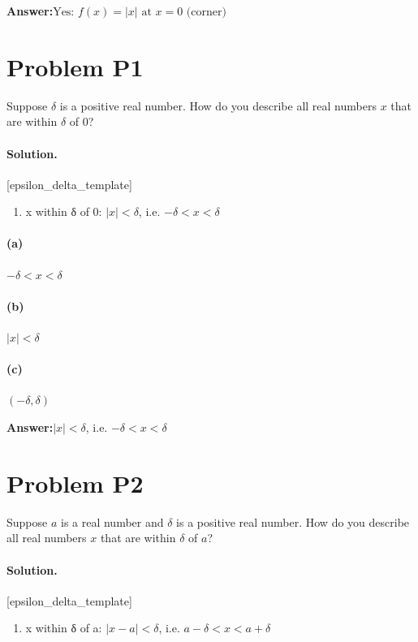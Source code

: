 \documentclass[11pt,a4paper]{article}
\newcommand{\solvertag}[1]{{\footnotesize\color{gray}\textsf{[#1]}}}
\begin{document}
\noindent\textbf{Answer:}\quad $\text{Yes: } f(x) = |x| \text{ at } x = 0 \text{ (corner)}$

\medskip

\section*{Problem P1}
Suppose $\delta$ is a positive real number. How do you describe all real numbers $x$ that are within $\delta$ of 0?

\paragraph{Solution.} \solvertag{epsilon\_delta\_template} 

\begin{enumerate}[leftmargin=*]
  \item x within δ of 0: $|x| < \delta$, i.e. $-\delta < x < \delta$
\end{enumerate}

\paragraph{(a)} $-\delta < x < \delta$

\paragraph{(b)} $|x| < \delta$

\paragraph{(c)} $(-\delta, \delta)$

\noindent\textbf{Answer:}\quad $|x| < \delta$, i.e. $-\delta < x < \delta$

\medskip

\section*{Problem P2}
Suppose $a$ is a real number and $\delta$ is a positive real number. How do you describe all real numbers $x$ that are within $\delta$ of $a$?

\paragraph{Solution.} \solvertag{epsilon\_delta\_template} 

\begin{enumerate}[leftmargin=*]
  \item x within δ of a: $|x - a| < \delta$, i.e. $a - \delta < x < a + \delta$
\end{enumerate}
\end{document}
